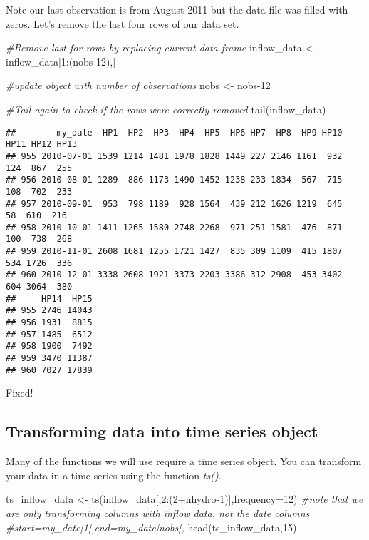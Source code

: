 \documentclass[
]{article}
\newenvironment{Shaded}{\begin{snugshade}}{\end{snugshade}}
\newcommand{\AttributeTok}[1]{\textcolor[rgb]{0.77,0.63,0.00}{#1}}
\newcommand{\CommentTok}[1]{\textcolor[rgb]{0.56,0.35,0.01}{\textit{#1}}}
\newcommand{\DecValTok}[1]{\textcolor[rgb]{0.00,0.00,0.81}{#1}}
\newcommand{\FunctionTok}[1]{\textcolor[rgb]{0.00,0.00,0.00}{#1}}
\newcommand{\NormalTok}[1]{#1}
\newcommand{\OtherTok}[1]{\textcolor[rgb]{0.56,0.35,0.01}{#1}}
\newcommand{\SpecialCharTok}[1]{\textcolor[rgb]{0.00,0.00,0.00}{#1}}
\begin{document}
Note our last observation is from August 2011 but the data file was
filled with zeros. Let's remove the last four rows of our data set.

\begin{Shaded}
\begin{Highlighting}[]
\CommentTok{\#Remove last for rows by replacing current data frame}
\NormalTok{inflow\_data }\OtherTok{\textless{}{-}}\NormalTok{ inflow\_data[}\DecValTok{1}\SpecialCharTok{:}\NormalTok{(nobs}\DecValTok{{-}12}\NormalTok{),]}

\CommentTok{\#update object with number of observations}
\NormalTok{nobs }\OtherTok{\textless{}{-}}\NormalTok{ nobs}\DecValTok{{-}12}

\CommentTok{\#Tail again to check if the rows were correctly removed}
\FunctionTok{tail}\NormalTok{(inflow\_data)}
\end{Highlighting}
\end{Shaded}

\begin{verbatim}
##        my_date  HP1  HP2  HP3  HP4  HP5  HP6 HP7  HP8  HP9 HP10 HP11 HP12 HP13
## 955 2010-07-01 1539 1214 1481 1978 1828 1449 227 2146 1161  932  124  867  255
## 956 2010-08-01 1289  886 1173 1490 1452 1238 233 1834  567  715  108  702  233
## 957 2010-09-01  953  798 1189  928 1564  439 212 1626 1219  645   58  610  216
## 958 2010-10-01 1411 1265 1580 2748 2268  971 251 1581  476  871  100  738  268
## 959 2010-11-01 2608 1681 1255 1721 1427  835 309 1109  415 1807  534 1726  336
## 960 2010-12-01 3338 2608 1921 3373 2203 3386 312 2908  453 3402  604 3064  380
##     HP14  HP15
## 955 2746 14043
## 956 1931  8815
## 957 1485  6512
## 958 1900  7492
## 959 3470 11387
## 960 7027 17839
\end{verbatim}

Fixed!

\hypertarget{transforming-data-into-time-series-object}{%
\subsection{Transforming data into time series
object}\label{transforming-data-into-time-series-object}}

Many of the functions we will use require a time series object. You can
transform your data in a time series using the function \emph{ts()}.

\begin{Shaded}
\begin{Highlighting}[]
\NormalTok{ts\_inflow\_data }\OtherTok{\textless{}{-}} \FunctionTok{ts}\NormalTok{(inflow\_data[,}\DecValTok{2}\SpecialCharTok{:}\NormalTok{(}\DecValTok{2}\SpecialCharTok{+}\NormalTok{nhydro}\DecValTok{{-}1}\NormalTok{)],}\AttributeTok{frequency=}\DecValTok{12}\NormalTok{) }
\CommentTok{\#note that we are only transforming columns with inflow data, not the date columns  \#start=my\_date[1],end=my\_date[nobs],}
\FunctionTok{head}\NormalTok{(ts\_inflow\_data,}\DecValTok{15}\NormalTok{)}
\end{Highlighting}
\end{Shaded}
\end{document}
